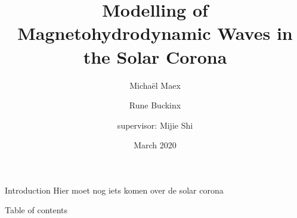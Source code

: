 \documentclass{beamer}
\title[]{Modelling of Magnetohydrodynamic Waves in the Solar Corona}
\author{\phantom{=/}  Micha\"el Maex \and Rune Buckinx \and supervisor: Mijie Shi }
\date{March 2020}
\begin{document}
\maketitle
\begin{frame}{Introduction} %
	Hier moet nog iets komen over de solar corona
\end{frame}

\begin{frame}{Table of contents}
    \tableofcontents
\end{frame}
\end{document}
